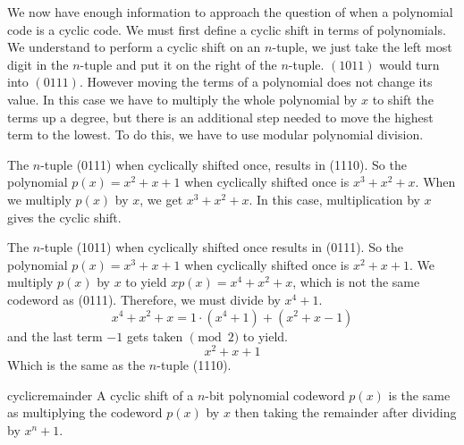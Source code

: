 We now have enough information to approach the question of when a polynomial code is a cyclic code.  We must first define a cyclic shift in terms of polynomials.  We understand to perform a cyclic shift on an $n$-tuple, we just take the left most digit in the $n$-tuple and put it on the right of the $n$-tuple.  $(1011)$ would turn into $(0111)$.  However moving the terms of a polynomial does not change its value.  In this case we have to multiply the whole polynomial by $x$ to shift the terms up a degree, but there is an additional step needed to move the highest term to the lowest.  To do this, we have to use modular polynomial division.  

\begin{example}{}
The $n$-tuple (0111) when cyclically shifted once, results in (1110).  So the polynomial $p(x) = x^2 + x + 1$ when cyclically shifted once is $x^3 + x^2 + x$.  When we multiply $p(x)$ by $x$, we get $x^3 + x^2 + x$.  In this case, multiplication by $x$ gives the cyclic shift.

The $n$-tuple (1011) when cyclically shifted once results in (0111).  So the polynomial $p(x) = x^3 + x + 1$ when cyclically shifted once is $x^2 + x + 1$.  We multiply $p(x)$ by $x$ to yield $xp(x) = x^4 + x^2 + x$, which is not the same codeword as (0111).  Therefore, we must divide by $x^4 + 1$.
\[x^4 + x^2 + x = 1\cdot (x^4 + 1) + (x^2 + x - 1)\]
and the last term $-1$ gets taken $\pmod 2$ to yield.
\[x^2 + x + 1\]
Which is the same as the $n$-tuple (1110).
\end{example}

\begin{prop}{cyclicremainder}
A cyclic shift of a $n$-bit polynomial codeword $p(x)$ is the same as multiplying the codeword $p(x)$ by $x$ then taking the remainder after dividing by $x^n + 1$.
\end{prop}

